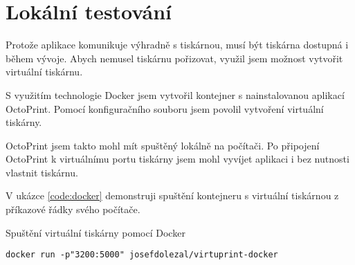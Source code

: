 \section{Lokální testování}

Protože aplikace komunikuje výhradně s tiskárnou, musí být tiskárna dostupná i během vývoje.
Abych nemusel tiskárnu pořizovat, využil jsem možnost vytvořit virtuální tiskárnu.

S využitím technologie Docker jsem vytvořil kontejner s nainstalovanou aplikací OctoPrint.
Pomocí konfiguračního souboru jsem povolil vytvoření virtuální tiskárny.

OctoPrint jsem takto mohl mít spuštěný lokálně na počítači.
Po připojení OctoPrint k virtuálnímu portu tiskárny jsem mohl vyvíjet aplikaci i bez nutnosti vlastnit tiskárnu.

V ukázce \ref{code:docker} demonstruji spuštění kontejneru s virtuální tiskárnou z příkazové řádky svého počítače.

\begin{listing}[htbp]
\caption{\label{code:docker}Spuštění virtuální tiskárny pomocí Docker}
\begin{verbatim}
docker run -p"3200:5000" josefdolezal/virtuprint-docker 
\end{verbatim}
\end{listing}

